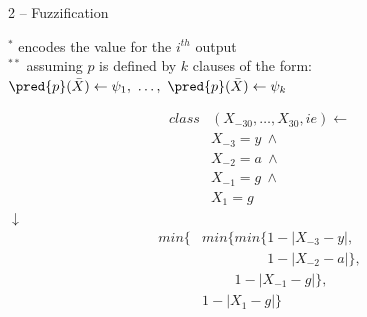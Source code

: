 \documentclass[presentation]{beamer}\mode<presentation>{\usetheme{AMSBolognaFC}}
\begin{document}
\begin{frame}{2 -- Fuzzification}
    
    \begin{minipage}{0.6\textwidth}
        
        
        \begin{center}\scriptsize
            $^{*}$ encodes the value for the $i^{th}$ output
            \\
            \smallskip
            $^{**}$ assuming $p$ is defined by $k$ clauses of the form:
            \\
            $\pred{p}(\bar{X}) \leftarrow \psi_1,\ \ldots,\ \pred{p}(\bar{X}) \leftarrow \psi_k$
        \end{center}
    \end{minipage}
    \begin{minipage}{0.35\textwidth}
        \begin{equation*}
            \begin{split}
                class&(X_{-30}, \dots, X_{30}, ie) \leftarrow\\
                &X_{-3} = y\ \wedge\\
                &X_{-2} = a\ \wedge\\
                &X_{-1} = g\ \wedge\\
                &X_{1} = g
            \end{split}
        \end{equation*}
        \centering
        $\downarrow$
        \begin{equation*}
            \begin{split}
                min\{&min\{min\{1-|X_{-3} - y|,\\
                &\phantom{min\{min\{}1-|X_{-2} - a|\},\\
                &\phantom{min\{}1-|X_{-1} - g|\},\\
                &1-|X_{1}-g|\}
            \end{split}
        \end{equation*}
    \end{minipage}
    
\end{frame}
\end{document}
